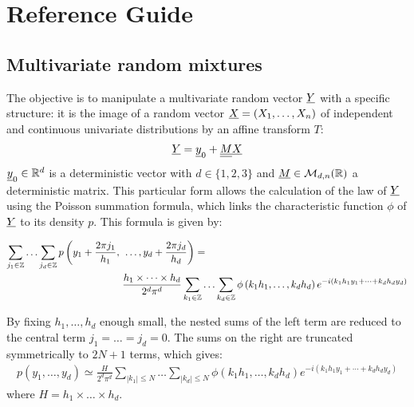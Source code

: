 



\section{Reference Guide}

\subsection{Multivariate random mixtures}

The objective is to manipulate a multivariate random vector ${\underline{Y}}$ with a specific structure:
it is the image of a random vector ${\underline{X}} = (X_1, \hdots, X_n) $ of independent and continuous univariate distributions by an affine transform $T$:
\begin{align}\label{defY}
  {\underline{Y}}={\underline{y}}_0+{\underline{\underline{M}}}{\underline{X}}
\end{align}
${\underline{y}}_0\in\mathbb{R}^d$ is a deterministic vector with $d\in\{1,2,3\}$ and ${\underline{M}}\in\mathcal{M}_{d,n}(\mathbb{R})$
a deterministic matrix. This particular form allows the calculation of the law of ${\underline{Y}} $ using the Poisson summation formula, which links the characteristic
function $\phi $ of ${\underline{Y}}$ to its density $p$. This formula is given by:

\begin{align}\label{poissonND}
  \sum_{j_1\in\mathbb{Z}}\hdots\sum_{j_d\in\mathbb{Z}} p\left(y_1+\frac{2\pi j_1}{h_1},\right.&\left.\hdots,y_d+\frac{2\pi j_d}{h_d}\right)=\notag\\
    &\frac{h_1\times\cdots\times h_d}{2^d\pi^d}\sum_{k_1\in\mathbb{Z}}\hdots\sum_{k_d\in\mathbb{Z}}\phi\left(k_1h_1,\hdots,k_dh_d\right)e^{-i(k_1h_1y_1+\cdots+k_dh_dy_d)}
\end{align}

By fixing $h_1,\hdots,h_d$ enough small, the nested sums of the left term are reduced to the central term $j_1=\hdots=j_d = 0$.
The sums on the right are truncated symmetrically to $ 2N +1 $ terms, which gives:
\begin{align}
  p\left(y_1,\hdots,y_d\right)\simeq\frac{H}{2^d\pi^d}\sum_{|k_1|\leq N}\hdots\sum_{|k_d|\leq N}\phi\left(k_1h_1,\hdots,k_dh_d\right)e^{-i(k_1h_1y_1+\cdots+k_dh_dy_d)}
\end{align}
where $H = h_1\times\hdots\times h_d$.

